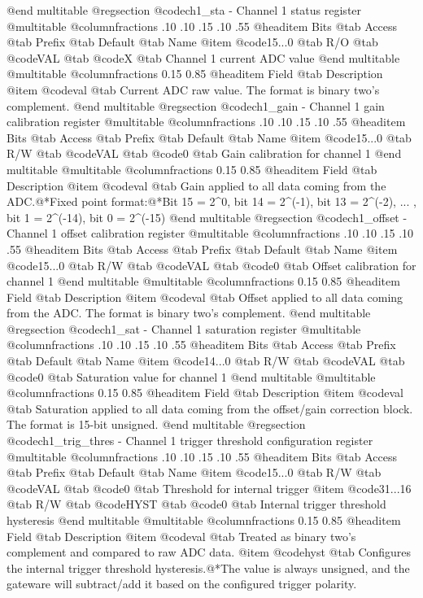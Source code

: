 @end multitable
@regsection @code{ch1_sta} - Channel 1 status register
@multitable @columnfractions .10 .10 .15 .10 .55
@headitem Bits @tab Access @tab Prefix @tab Default @tab Name
@item @code{15...0}
@tab R/O @tab
@code{VAL}
@tab @code{X} @tab 
Channel 1 current ADC value
@end multitable
@multitable @columnfractions 0.15 0.85
@headitem Field @tab Description
@item @code{val} @tab Current ADC raw value. The format is binary two's complement.
@end multitable
@regsection @code{ch1_gain} - Channel 1 gain calibration register
@multitable @columnfractions .10 .10 .15 .10 .55
@headitem Bits @tab Access @tab Prefix @tab Default @tab Name
@item @code{15...0}
@tab R/W @tab
@code{VAL}
@tab @code{0} @tab 
Gain calibration for channel 1
@end multitable
@multitable @columnfractions 0.15 0.85
@headitem Field @tab Description
@item @code{val} @tab Gain applied to all data coming from the ADC.@*Fixed point format:@*Bit 15 = 2^0, bit 14 = 2^(-1), bit 13 = 2^(-2), ... , bit 1 = 2^(-14), bit 0 = 2^(-15)
@end multitable
@regsection @code{ch1_offset} - Channel 1 offset calibration register
@multitable @columnfractions .10 .10 .15 .10 .55
@headitem Bits @tab Access @tab Prefix @tab Default @tab Name
@item @code{15...0}
@tab R/W @tab
@code{VAL}
@tab @code{0} @tab 
Offset calibration for channel 1
@end multitable
@multitable @columnfractions 0.15 0.85
@headitem Field @tab Description
@item @code{val} @tab Offset applied to all data coming from the ADC. The format is binary two's complement.
@end multitable
@regsection @code{ch1_sat} - Channel 1 saturation register
@multitable @columnfractions .10 .10 .15 .10 .55
@headitem Bits @tab Access @tab Prefix @tab Default @tab Name
@item @code{14...0}
@tab R/W @tab
@code{VAL}
@tab @code{0} @tab 
Saturation value for channel 1
@end multitable
@multitable @columnfractions 0.15 0.85
@headitem Field @tab Description
@item @code{val} @tab Saturation applied to all data coming from the offset/gain correction block. The format is 15-bit unsigned.
@end multitable
@regsection @code{ch1_trig_thres} - Channel 1 trigger threshold configuration register
@multitable @columnfractions .10 .10 .15 .10 .55
@headitem Bits @tab Access @tab Prefix @tab Default @tab Name
@item @code{15...0}
@tab R/W @tab
@code{VAL}
@tab @code{0} @tab 
Threshold for internal trigger
@item @code{31...16}
@tab R/W @tab
@code{HYST}
@tab @code{0} @tab 
Internal trigger threshold hysteresis
@end multitable
@multitable @columnfractions 0.15 0.85
@headitem Field @tab Description
@item @code{val} @tab Treated as binary two's complement and compared to raw ADC data.
@item @code{hyst} @tab Configures the internal trigger threshold hysteresis.@*The value is always unsigned, and the gateware will subtract/add it based on the configured trigger polarity.
